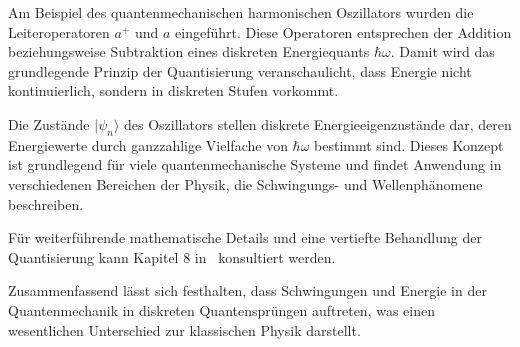 	Am Beispiel des quantenmechanischen harmonischen Oszillators wurden die Leiteroperatoren $a^+$ und $a$ eingeführt.
	Diese Operatoren entsprechen der Addition beziehungsweise Subtraktion eines diskreten Energiequants $\hbar \omega$.
	Damit wird das grundlegende Prinzip der Quantisierung veranschaulicht, dass Energie nicht kontinuierlich, sondern in diskreten Stufen vorkommt.

	Die Zustände $|\psi_n\rangle$ des Oszillators stellen diskrete Energieeigenzustände dar, deren Energiewerte durch ganzzahlige Vielfache von $\hbar \omega$ bestimmt sind.
	Dieses Konzept ist grundlegend für viele quantenmechanische Systeme und findet Anwendung in verschiedenen Bereichen der Physik, die Schwingungs- und Wellenphänomene beschreiben.

	Für weiterführende mathematische Details und eine vertiefte Behandlung der Quantisierung kann Kapitel 8 in~\cite{fourier:quantenmechanik} konsultiert werden.

	Zusammenfassend lässt sich festhalten, dass Schwingungen und Energie in der Quantenmechanik in diskreten Quantensprüngen auftreten, was einen wesentlichen Unterschied zur klassischen Physik darstellt.
